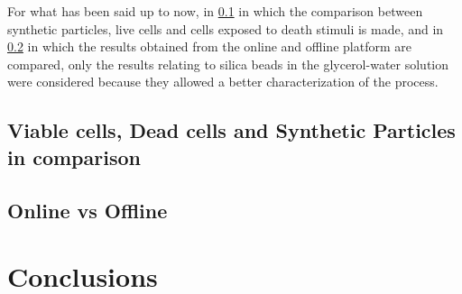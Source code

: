 \documentclass[journal]{IEEEtran}
\theoremstyle{definition}
\theoremstyle{remark}
\begin{document}
For what has been said up to now, in \sect\ref{sec:comparison} in which the comparison between synthetic particles, live cells and cells exposed to death stimuli is made, and in \sect\ref{sec:OnlineOffline} in which the results obtained from the online and offline platform are compared, only the results relating to silica beads in the glycerol-water solution were considered because they allowed a better characterization of the process.

\subsection{Viable cells, Dead cells and Synthetic Particles in comparison}\label{sec:comparison}

\subsection{Online vs Offline}\label{sec:OnlineOffline}

\section{Conclusions}



%
\end{document}
